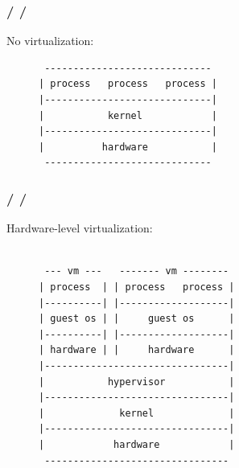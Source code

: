 \documentclass{beamer}
\newcommand{\autotitle}
{\frametitle{
    \secname
    \ifx\insertsubsection\empty
    \else
        /\subsecname
        \ifx\insertsubsubsection\empty\else/\subsubsecname\fi
    \fi}}
\begin{document}
\begin{frame}[fragile]
    \autotitle
    No virtualization:
    \begin{figure}
        \centering
        \begin{varwidth}{\linewidth}
            \begin{verbatim}
 -----------------------------
| process   process   process |
|-----------------------------|
|           kernel            |
|-----------------------------|
|          hardware           |
 -----------------------------
            \end{verbatim}
        \end{varwidth}
    \end{figure}
\end{frame}

\begin{frame}[fragile]
    \autotitle
    Hardware-level virtualization:
    \begin{figure}
        \centering
        \begin{varwidth}{\linewidth}
            \begin{verbatim}

 --- vm ---   ------- vm --------
| process  | | process   process |
|----------| |-------------------|
| guest os | |     guest os      |
|----------| |-------------------|
| hardware | |     hardware      |
|--------------------------------|
|           hypervisor           |
|--------------------------------|
|             kernel             |
|--------------------------------|
|            hardware            |
 --------------------------------
            \end{verbatim}
        \end{varwidth}
    \end{figure}
\end{frame}
\end{document}
